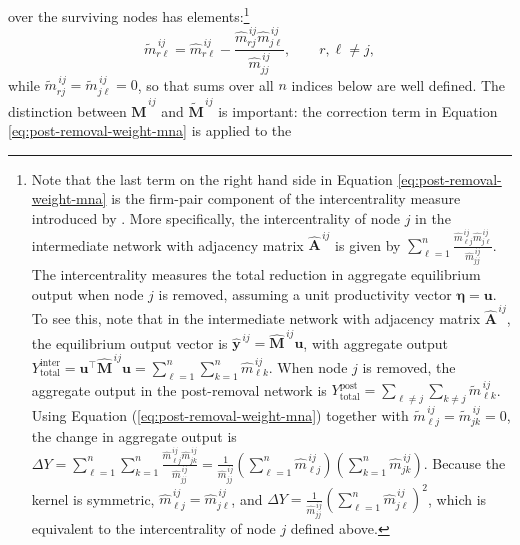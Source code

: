 over the surviving nodes has elements:\footnote{Note that the last term on the right hand side in Equation \eqref{eq:post-removal-weight-mna} is the firm-pair component of the intercentrality measure introduced by \citet{ballester06:_who_networ}. More specifically, the intercentrality of node $j$ in the intermediate network with adjacency matrix $\widehat{\mathbf{A}}^{\,ij}$ is given by $\sum_{\ell=1}^n \frac{\widehat m_{\ell j}^{\,ij}\widehat m_{j \ell}^{\,ij}}{\widehat m_{jj}^{\,ij}}$.
The intercentrality measures the total reduction in aggregate equilibrium output when node $j$ is removed, assuming a unit productivity vector $\bm{\eta} = \mathbf{u}$. To see this, note that in the intermediate network with adjacency matrix $\widehat{\mathbf{A}}^{\,ij}$, the equilibrium output vector is $\widehat{\mathbf{y}}^{\,ij} = \widehat{\mathbf{M}}^{\,ij}\mathbf{u}$, with aggregate output
$
Y_{\text{total}}^{\text{inter}} = \mathbf{u}^\top \widehat{\mathbf{M}}^{\,ij}\mathbf{u} = \sum_{\ell=1}^n \sum_{k=1}^n \widehat{m}_{\ell k}^{\,ij}
$.
When node $j$ is removed, the aggregate output in the post-removal network is
$
Y_{\text{total}}^{\text{post}} = \sum_{\ell \neq j} \sum_{k \neq j} \widetilde{m}_{\ell k}^{\,ij}
$.
Using Equation (\ref{eq:post-removal-weight-mna}) together with $\widetilde m_{\ell j}^{\,ij} = \widetilde m_{j k}^{\,ij} = 0$, the change in aggregate output is
$
\Delta Y = \sum_{\ell=1}^n \sum_{k=1}^n \frac{\widehat{m}_{\ell j}^{\,ij} \widehat{m}_{j k}^{\,ij}}{\widehat{m}_{jj}^{\,ij}} = \frac{1}{\widehat{m}_{jj}^{\,ij}} \left( \sum_{\ell=1}^n \widehat{m}_{\ell j}^{\,ij} \right) \left( \sum_{k=1}^n \widehat{m}_{j k}^{\,ij} \right)
$.
Because the kernel is symmetric, $\widehat{m}_{\ell j}^{\,ij} = \widehat{m}_{j \ell}^{\,ij}$, and
$
\Delta Y = \frac{1}{\widehat{m}_{jj}^{\,ij}} \left( \sum_{\ell=1}^n \widehat{m}_{j \ell}^{\,ij} \right)^2
$,
which is equivalent to the intercentrality of node $j$ defined above.} %
\begin{equation}
\widetilde m_{r\ell}^{\,ij}
=
\widehat m_{r\ell}^{\,ij}
-
\frac{
\widehat m_{rj}^{\,ij}\widehat m_{j\ell}^{\,ij}
}{
\widehat m_{jj}^{\,ij}
},
\qquad r,\ell \neq j,
\label{eq:post-removal-weight-mna}
\end{equation}
while $\widetilde m_{r j}^{\,ij} = \widetilde m_{j \ell}^{\,ij} = 0$, so that sums over all $n$ indices below are well defined. The distinction between $\widehat{\mathbf{M}}^{\,ij}$ and
$\widetilde{\mathbf{M}}^{\,ij}$ is important: the correction term in Equation \eqref{eq:post-removal-weight-mna} is applied to the
